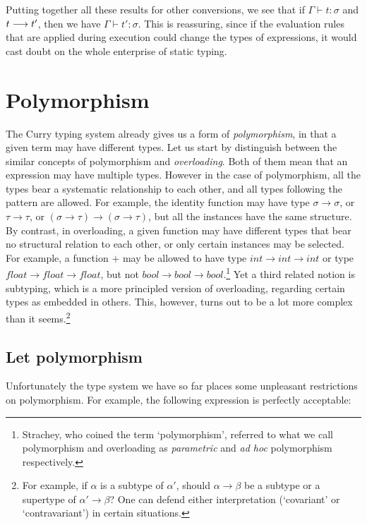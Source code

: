 Putting together all these results for other conversions, we see that if
$\Gamma \vdash t : \sigma$ and $t \longrightarrow t'$, then we have $\Gamma \vdash t' :
\sigma$. This is reassuring, since if the evaluation rules that are applied
during execution could change the types of expressions, it would cast doubt on
the whole enterprise of static typing.

\section{Polymorphism}

The Curry typing system already gives us a form of {\em polymorphism}, in that
a given term may have different types. Let us start by distinguish between the
similar concepts of polymorphism and {\em overloading}. Both of them mean that
an expression may have multiple types. However in the case of polymorphism, all
the types bear a systematic relationship to each other, and all types following
the pattern are allowed. For example, the identity function may have type
$\sigma \to \sigma$, or $\tau \to \tau$, or $(\sigma \to \tau) \to (\sigma \to
\tau)$, but all the instances have the same structure. By contrast, in
overloading, a given function may have different types that bear no structural
relation to each other, or only certain instances may be selected. For example,
a function $+$ may be allowed to have type $int \to int \to int$ or type $float
\to float \to float$, but not $bool \to bool \to bool$.\footnote{Strachey, who
coined the term `polymorphism', referred to what we call polymorphism and
overloading as {\em parametric} and {\em ad hoc} polymorphism respectively.}
Yet a third related notion is subtyping, which is a more principled version of
overloading, regarding certain types as embedded in others. This, however,
turns out to be a lot more complex than it seems.\footnote{For example, if
$\alpha$ is a subtype of $\alpha'$, should $\alpha \to \beta$ be a subtype or a
supertype of $\alpha' \to \beta$? One can defend either interpretation
(`covariant' or `contravariant') in certain situations.}

\subsection{Let polymorphism}

Unfortunately the type system we have so far places some unpleasant
restrictions on polymorphism. For example, the following expression is
perfectly acceptable:

